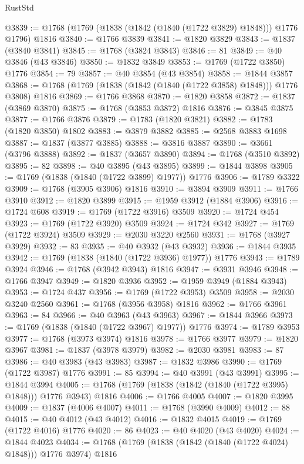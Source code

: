 \begin{lexlean}{RustStd}
\begin{coremodule}
@3839 := @1768 (@1769 (@1838 (@1842 (@1840 (@1722 @3829) @1848))) @1776 @1796) @1816
@3840 := @1766 @3839
@3841 := @1820 @3829
@3843 := @1837 (@3840 @3841)
@3845 := @1768 (@3824 @3843)
@3846 := 81
@3849 := @40 @3846 (@43 @3846)
@3850 := @1832 @3849
@3853 := @1769 (@1722 @3850) @1776
@3854 := 79
@3857 := @40 @3854 (@43 @3854)
@3858 := @1844 @3857
@3868 := @1768 (@1769 (@1838 (@1842 (@1840 (@1722 @3858) @1848))) @1776 @3808) @1816
@3869 := @1766 @3868
@3870 := @1820 @3858
@3872 := @1837 (@3869 @3870)
@3875 := @1768 (@3853 @3872) @1816
@3876 := @3845 @3875
@3877 := @1766 @3876
@3879 := @1783 (@1820 @3821)
@3882 := @1783 (@1820 @3850) @1802
@3883 := @3879 @3882
@3885 := @2568 @3883 @1698
@3887 := @1837 (@3877 @3885)
@3888 := @3816 @3887
@3890 := @3661 (@3796 @3888)
@3892 := @1837 (@3657 @3890)
@3894 := @1768 (@3510 @3892)
@3895 := 82
@3898 := @40 @3895 (@43 @3895)
@3899 := @1844 @3898
@3905 := @1769 (@1838 (@1840 (@1722 @3899) @1977)) @1776
@3906 := @1789 @3322
@3909 := @1768 (@3905 @3906) @1816
@3910 := @3894 @3909
@3911 := @1766 @3910
@3912 := @1820 @3899
@3915 := @1959 @3912 (@1884 @3906)
@3916 := @1724 @608
@3919 := @1769 (@1722 @3916) @3509
@3920 := @1724 @454
@3923 := @1769 (@1722 @3920) @3509
@3924 := @1724 @342
@3927 := @1769 (@1722 @3924) @3509
@3929 := @2030 @3220 @2560
@3931 := @1768 (@3927 @3929)
@3932 := 83
@3935 := @40 @3932 (@43 @3932)
@3936 := @1844 @3935
@3942 := @1769 (@1838 (@1840 (@1722 @3936) @1977)) @1776
@3943 := @1789 @3924
@3946 := @1768 (@3942 @3943) @1816
@3947 := @3931 @3946
@3948 := @1766 @3947
@3949 := @1820 @3936
@3952 := @1959 @3949 (@1884 @3943)
@3953 := @1724 @437
@3956 := @1769 (@1722 @3953) @3509
@3958 := @2030 @3240 @2560
@3961 := @1768 (@3956 @3958) @1816
@3962 := @1766 @3961
@3963 := 84
@3966 := @40 @3963 (@43 @3963)
@3967 := @1844 @3966
@3973 := @1769 (@1838 (@1840 (@1722 @3967) @1977)) @1776
@3974 := @1789 @3953
@3977 := @1768 (@3973 @3974) @1816
@3978 := @1766 @3977
@3979 := @1820 @3967
@3981 := @1837 (@3978 @3979)
@3982 := @2030 @3981
@3983 := 87
@3986 := @40 @3983 (@43 @3983)
@3987 := @1832 @3986
@3990 := @1769 (@1722 @3987) @1776
@3991 := 85
@3994 := @40 @3991 (@43 @3991)
@3995 := @1844 @3994
@4005 := @1768 (@1769 (@1838 (@1842 (@1840 (@1722 @3995) @1848))) @1776 @3943) @1816
@4006 := @1766 @4005
@4007 := @1820 @3995
@4009 := @1837 (@4006 @4007)
@4011 := @1768 (@3990 @4009)
@4012 := 88
@4015 := @40 @4012 (@43 @4012)
@4016 := @1832 @4015
@4019 := @1769 (@1722 @4016) @1776
@4020 := 86
@4023 := @40 @4020 (@43 @4020)
@4024 := @1844 @4023
@4034 := @1768 (@1769 (@1838 (@1842 (@1840 (@1722 @4024) @1848))) @1776 @3974) @1816

\end{coremodule}
\end{lexlean}

